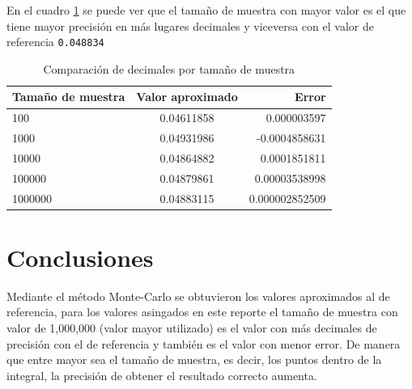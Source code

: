 \documentclass{article}
\begin{document}
En el cuadro \ref{esto} se puede ver que el tamaño de muestra con mayor valor es el que tiene mayor precisión en más lugares decimales y viceversa con el valor de referencia \texttt{0.048834}
\begin{table}[h!]
\caption{Comparación de decimales por tamaño de muestra}
\label{esto}
\vspace*{3mm}
\centering
\begin{tabular}{l|c|r} 
Tamaño de muestra & Valor aproximado & Error \\  \hline
100 & 0.04611858 & 0.000003597 \\
1000 &  0.04931986 & -0.0004858631 \\
10000 & 0.04864882 & 0.0001851811 \\
100000 & 0.04879861 & 0.00003538998 \\
1000000 & 0.04883115 & 0.000002852509 \\
\end{tabular}
\end{table}

\newpage

\section{Conclusiones}

Mediante el método Monte-Carlo se obtuvieron los valores aproximados al de referencia, para los valores asingados en este reporte el tamaño de muestra con valor de 1,000,000 (valor mayor utilizado) es el valor con más decimales de precisión con el de referencia y también es el valor con menor error. 
De manera que entre mayor sea el tamaño de muestra, es decir, los puntos dentro de la integral, la precisión de obtener el resultado correcto aumenta.



\end{document}
